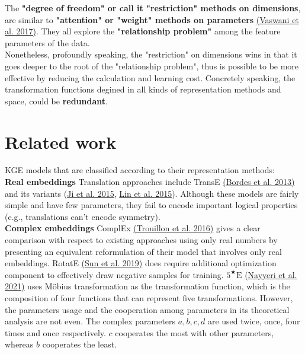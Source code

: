 \documentclass[9pt]{ctexart}
\theoremstyle{definition}
\begin{document}
The \textbf{"degree of freedom" or call it "restriction" methods on dimensions}, are similar to \textbf{"attention" or "weight" methods on parameters}
\hyperlink{Vas17}{(Vaswani et al. 2017)}.
They all explore the \textbf{"relationship problem"} among the feature parameters of the data.\\
Nonetheless, profoundly speaking, the "restriction" on dimensions wins in that it goes deeper to the root of the "relationship problem", thus is possible to be more effective by reducing the calculation and learning cost.
Concretely speaking, the transformation functions degined in all kinds of representation methods and space, could be \textbf{redundant}.

\section{Related work}
KGE models that are classified according to their representation methods:\\
\textbf{Real embeddings} Translation approaches include TransE 
\hyperlink{Bor13}{(Bordes et al. 2013)} 
and its variants 
(\hyperlink{Jie15}{Ji et al. 2015}, 
\hyperlink{Lin15}{Lin et al. 2015}).
Although these models are fairly simple and have few parameters, they fail to encode important logical properties (e.g., translations can't encode symmetry).\\
\textbf{Complex embeddings} ComplEx \hyperlink{Tro16}{(Trouillon et al. 2016)} gives a clear comparison with respect to existing approaches using only real numbers by presenting an equivalent reformulation of their model that involves only real embeddings.
RotatE \hyperlink{Sun19}{(Sun et al. 2019)} does require additional optimization component to effectively draw negative samples for training.
$5^{\bigstar}\mathrm{E}$ 
\hyperlink{Nay21}{(Nayyeri et al. 2021)}
uses Möbius transformation as the transformation function, which is the composition of four functions that can represent five transformations. 
However, the parameters usage and the cooperation among parameters in its theoretical analysis are not even. 
The complex parameters $a, b, c, d$ are used twice, once, four times and once respectively.
$c$ cooperates the most with other parameters, whereas $b$ cooperates the least.
\end{document}
